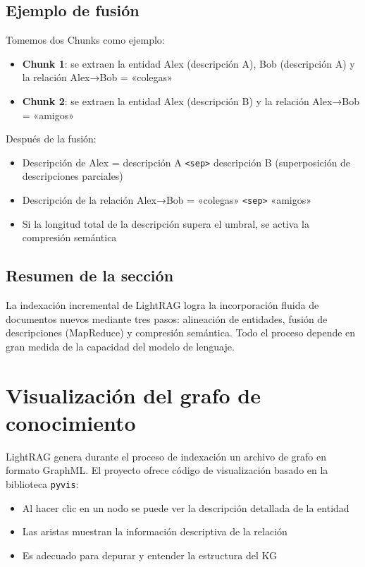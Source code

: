 \documentclass[a4paper]{article}
\begin{document}
\subsection{Ejemplo de fusión}

Tomemos dos Chunks como ejemplo:
\begin{itemize}
    \item \textbf{Chunk 1}: se extraen la entidad Alex (descripción A), Bob (descripción A) y la relación Alex→Bob = «colegas»
    \item \textbf{Chunk 2}: se extraen la entidad Alex (descripción B) y la relación Alex→Bob = «amigos»
\end{itemize}

Después de la fusión:
\begin{itemize}
    \item Descripción de Alex = descripción A \texttt{<sep>} descripción B (superposición de descripciones parciales)
    \item Descripción de la relación Alex→Bob = «colegas» \texttt{<sep>} «amigos»
    \item Si la longitud total de la descripción supera el umbral, se activa la compresión semántica
\end{itemize}

\subsection{Resumen de la sección}

La indexación incremental de LightRAG logra la incorporación fluida de documentos nuevos mediante tres pasos: alineación de entidades, fusión de descripciones (MapReduce) y compresión semántica. Todo el proceso depende en gran medida de la capacidad del modelo de lenguaje.
\section{Visualización del grafo de conocimiento}

LightRAG genera durante el proceso de indexación un archivo de grafo en formato GraphML. El proyecto ofrece código de visualización basado en la biblioteca \texttt{pyvis}:

\begin{itemize}
    \item Al hacer clic en un nodo se puede ver la descripción detallada de la entidad
    \item Las aristas muestran la información descriptiva de la relación
    \item Es adecuado para depurar y entender la estructura del KG
\end{itemize}
\end{document}
